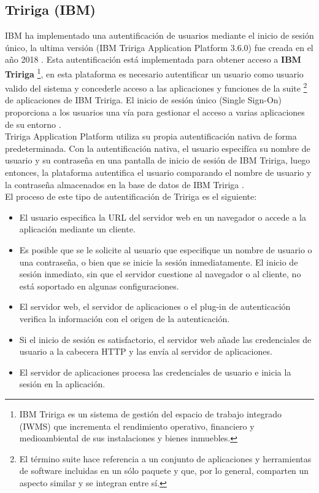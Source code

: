 \documentclass[12pt, a4paper, titlepage]{report}
\begin{document}
            \subsection{Tririga (IBM)}
                IBM ha implementado una autentificación de usuarios mediante el inicio de sesión único, la ultima versión (IBM Tririga Application Platform 3.6.0) fue creada en el año 2018 \cite{refIBMTRIRIGAYear}. Esta autentificación está implementada para obtener acceso a \textbf{IBM Tririga} \footnote{IBM Tririga es un sistema de gestión del espacio de trabajo integrado (IWMS) que incrementa el rendimiento operativo, financiero y medioambiental de sus instalaciones y bienes inmuebles.}, en esta plataforma es necesario autentificar un usuario como usuario valido del sistema y concederle acceso a las aplicaciones y funciones de la suite \footnote{El término suite hace referencia a un conjunto de aplicaciones y herramientas de software incluidas en un sólo paquete y que, por lo general, comparten un aspecto similar y se integran entre sí.} de aplicaciones de IBM Tririga. El inicio de sesión único (\Gls{Single Sign-On}) proporciona a los usuarios una vía para gestionar el acceso a varias aplicaciones de su entorno \cite{refIBMTRIRIGA}. \\
            
                Tririga Application Platform utiliza su propia autentificación nativa de forma predeterminada. Con la autentificación nativa, el usuario especifíca su nombre de usuario y su contraseña en una pantalla de inicio de sesión de IBM Tririga, luego entonces, la plataforma autentifica el usuario comparando el nombre de usuario y la contraseña almacenados en la base de datos de IBM Tririga \cite{refIBMTRIRIGA}. \\
                
                El proceso de este tipo de autentificación de Tririga es el siguiente:
                \begin{itemize}
                    \item El usuario especifica la URL del servidor web en un navegador o accede a la aplicación mediante un cliente.
                    \item Es posible que se le solicite al usuario que especifique un nombre de usuario o una contraseña, o bien que se inicie la sesión inmediatamente. El inicio de sesión inmediato, sin que el servidor cuestione al navegador o al cliente, no está soportado en algunas configuraciones.
                    \item El servidor web, el servidor de aplicaciones o el plug-in de autenticación verifica la información con el origen de la autenticación.
                    \item Si el inicio de sesión es satisfactorio, el servidor web añade las credenciales de usuario a la cabecera HTTP y las envía al servidor de aplicaciones.
                    \item El servidor de aplicaciones procesa las credenciales de usuario e inicia la sesión en la aplicación.
                \end{itemize}
            
\end{document}
